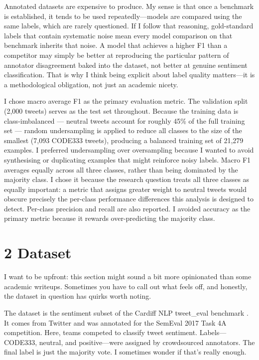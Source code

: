 \documentclass[12pt]{article}
\begin{document}
Annotated datasets are expensive to produce. My sense is that once a benchmark is established, it tends to be used repeatedly—models are compared using the same labels, which are rarely questioned. If I follow that reasoning, gold-standard labels that contain systematic noise mean every model comparison on that benchmark inherits that noise. A model that achieves a higher F1 than a competitor may simply be better at reproducing the particular pattern of annotator disagreement baked into the dataset, not better at genuine sentiment classification. That is why I think being explicit about label quality matters—it is a methodological obligation, not just an academic nicety.



I chose macro average F1 as the primary evaluation metric. The validation split (2,000 tweets) serves as the test set throughout. Because the training data is class-imbalanced --- neutral tweets account for roughly 45\% of the full training set --- random undersampling is applied to reduce all classes to the size of the smallest (7,093 CODE333 tweets), producing a balanced training set of 21,279 examples. I preferred undersampling over oversampling because I wanted to avoid synthesising or duplicating examples that might reinforce noisy labels. Macro F1 averages equally across all three classes, rather than being dominated by the majority class. I chose it because the research question treats all three classes as equally important: a metric that assigns greater weight to neutral tweets would obscure precisely the per-class performance differences this analysis is designed to detect. Per-class precision and recall are also reported. I avoided accuracy as the primary metric because it rewards over-predicting the majority class.



\section*{2 Dataset}



I want to be upfront: this section might sound a bit more opinionated than some academic writeups. Sometimes you have to call out what feels off, and honestly, the dataset in question has quirks worth noting.



The dataset is the sentiment subset of the Cardiff NLP tweet\_eval benchmark \citep{barbieri2020tweeteval}. It comes from Twitter and was annotated for the SemEval 2017 Task 4A competition. Here, teams competed to classify tweet sentiment. Labels—CODE333, neutral, and positive—were assigned by crowdsourced annotators. The final label is just the majority vote. I sometimes wonder if that's really enough.
\end{document}

